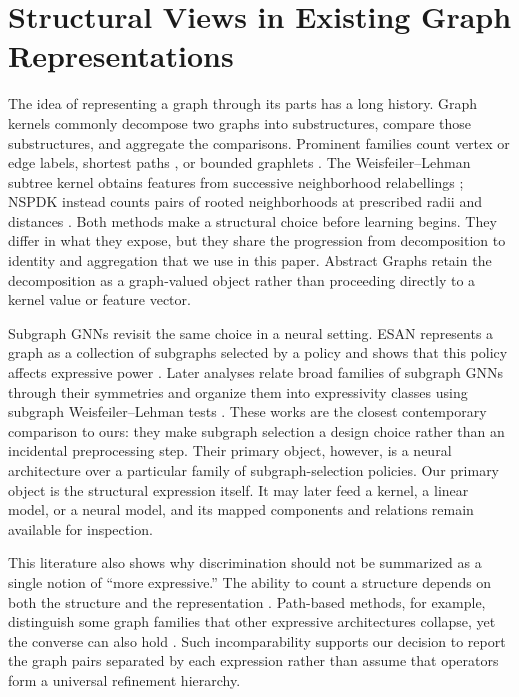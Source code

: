 \section{Structural Views in Existing Graph Representations}
\label{sec:related-work}

The idea of representing a graph through its parts has a long history. Graph
kernels commonly decompose two graphs into substructures, compare those
substructures, and aggregate the comparisons. Prominent families count vertex
or edge labels, shortest paths \cite{Borgwardt2005ShortestPath}, or bounded graphlets
\cite{Shervashidze2009Graphlet}. The Weisfeiler--Lehman subtree
kernel obtains features from successive neighborhood relabellings
\cite{Shervashidze2011WeisfeilerLehman}; NSPDK instead counts pairs of rooted
neighborhoods at prescribed radii and distances \cite{Costa2010NSPDK}. Both
methods make a structural choice before learning begins. They differ in what
they expose, but they share the progression from decomposition to identity and
aggregation that we use in this paper. Abstract Graphs retain the decomposition
as a graph-valued object rather than proceeding directly to a kernel value or
feature vector.

Subgraph GNNs revisit the same choice in a neural setting. ESAN represents a
graph as a collection of subgraphs selected by a policy and shows that this
policy affects expressive power \cite{Bevilacqua2022ESAN}. Later analyses
relate broad families of subgraph GNNs through their symmetries
\cite{Frasca2022SubgraphSymmetries} and organize them into expressivity classes
using subgraph Weisfeiler--Lehman tests \cite{Zhang2023SubgraphWL}. These works
are the closest contemporary comparison to ours: they make subgraph selection
a design choice rather than an incidental preprocessing step. Their primary
object, however, is a neural architecture over a particular family of
subgraph-selection policies. Our primary object is the structural expression
itself. It may later feed a kernel, a linear model, or a neural model, and its
mapped components and relations remain available for inspection.

This literature also shows why discrimination should not be summarized as a
single notion of ``more expressive.'' The ability to count a structure depends
on both the structure and the representation \cite{Chen2020CountSubstructures}.
Path-based methods, for example, distinguish some graph families that other
expressive architectures collapse, yet the converse can also hold
\cite{Graziani2024PathExpressivity}. Such incomparability supports our decision
to report the graph pairs separated by each expression rather than assume that
operators form a universal refinement hierarchy.

